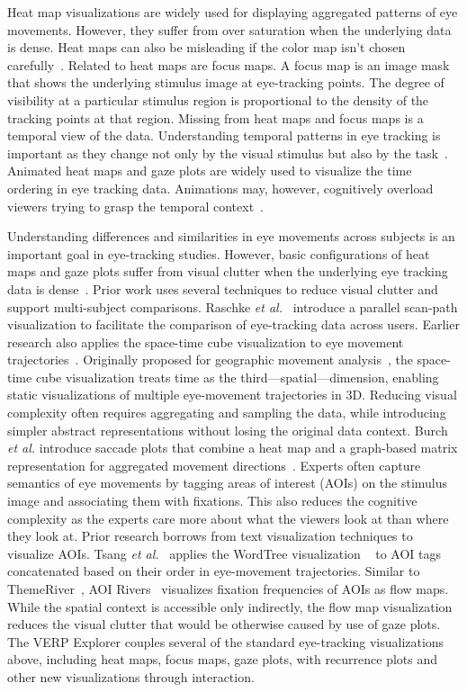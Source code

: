 \documentclass[journal]{vgtc}                %
\newcommand{\etal}{\textit{et al.}\xspace}
\begin{document}
Heat map visualizations are widely used for displaying aggregated patterns
of eye movements. However, they suffer from over saturation when the
underlying data is dense.  Heat maps can also be misleading if the color
map isn’t chosen carefully~\cite{Borland_2007}. Related to heat maps are
focus maps.  A focus map is an image mask that shows the underlying
stimulus image at eye-tracking points.  The degree of visibility at a
particular stimulus region is proportional to the density of the tracking
points at that region.  Missing from heat maps and focus maps is a temporal
view of the data. Understanding temporal patterns in eye tracking is
important as they change not only by the visual stimulus but also by the
task~\cite{Yarbus_1967}. Animated heat maps and gaze plots are widely used
to visualize the time ordering in eye tracking data. Animations may,
however, cognitively overload viewers trying to grasp the temporal
context~\cite{TVERSKY_2002}. 

Understanding differences and similarities in eye movements across subjects
is an important goal in eye-tracking studies. However, basic configurations
of heat maps and gaze plots suffer from visual clutter when the underlying
eye tracking data is dense~\cite{Blascheck_2014}. Prior work uses several
techniques to reduce visual clutter and support multi-subject comparisons.
Raschke \etal ~\cite{Raschke_2012} introduce a parallel scan-path
visualization to facilitate the comparison of eye-tracking data across
users.  Earlier research also applies the space-time cube visualization to
eye movement trajectories~\cite{Li_2010,Kurzhals_2013}. Originally proposed
for geographic movement analysis~\cite{Hagerstrand_1970,Kraak_2003}, the
space-time cube visualization treats time as the third—spatial—dimension,
enabling static visualizations of multiple eye-movement trajectories in 3D.
Reducing visual complexity often requires aggregating and sampling the
data, while introducing simpler abstract representations without losing the
original data context.  Burch \etal introduce saccade plots that combine
a heat map  and a graph-based matrix representation for aggregated movement
directions~\cite{Burch_2014b}. Experts often capture semantics of eye
movements by tagging areas of interest (AOIs) on the stimulus image and
associating them with fixations.  This also reduces the cognitive
complexity as the experts care more about what the viewers look at than
where they look at. Prior research borrows from text visualization
techniques to visualize AOIs. Tsang \etal~\cite{Tsang_2010} applies the
WordTree visualization ~\cite{Wattenberg_2008} to AOI tags concatenated
based on their order in eye-movement trajectories. Similar to
ThemeRiver~\cite{Havre_2000}, AOI Rivers~\cite{Burch_2013} visualizes
fixation frequencies of AOIs as flow maps. While the spatial context is
accessible only indirectly, the flow map visualization reduces the visual
clutter that would be otherwise caused by use of gaze plots. The VERP
Explorer couples several of the standard eye-tracking visualizations above,
including heat maps, focus maps, gaze plots, with recurrence plots and
other new visualizations through interaction. 
	
\end{document}
